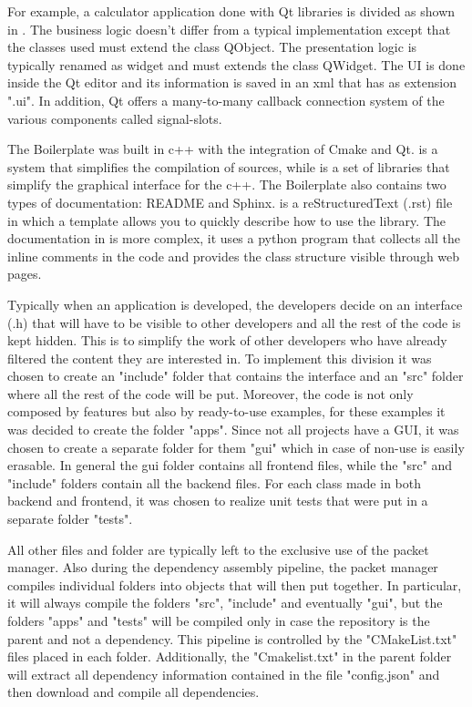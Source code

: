 For example, a calculator application done with Qt libraries is divided as shown in . The business logic doesn't differ from a typical implementation except that the classes used must extend the class QObject. The presentation logic is typically renamed as widget and must extends the class QWidget. The UI is done inside the Qt editor and its information is saved in an xml that has as extension ".ui". In addition, Qt offers a many-to-many callback connection system of the various components called signal-slots.


The Boilerplate was built in c++ with the integration of Cmake and Qt.
 is a system that simplifies the compilation of sources, while  is a set of libraries that simplify the graphical interface for the c++. The Boilerplate also contains two types of documentation: README and Sphinx.
 is a reStructuredText (.rst) file in which a template allows you to quickly describe how to use the library.
The documentation in  is more complex, it uses a python program that collects all the inline comments in the code and provides the class structure visible through web pages.

Typically when an application is developed, the developers decide on an interface (.h) that will have to be visible to other developers and all the rest of the code is kept hidden. This is to simplify the work of other developers who have already filtered the content they are interested in.
To implement this division it was chosen to create an "include" folder that contains the interface and an "src" folder where all the rest of the code will be put.
Moreover, the code is not only composed by features but also by ready-to-use examples, for these examples it was decided to create the folder "apps".
Since not all projects have a GUI, it was chosen to create a separate folder for them "gui" which in case of non-use is easily erasable.
In general the gui folder contains all frontend files, while the "src" and "include" folders contain all the backend files.
For each class made in both backend and frontend, it was chosen to realize unit tests that were put in a separate folder "tests".

All other files and folder are typically left to the exclusive use of the packet manager.
Also during the dependency assembly pipeline, the packet manager compiles individual folders into objects that will then put together. In particular, it will always compile the folders "src", "include" and eventually "gui", but the folders "apps" and "tests" will be compiled only in case the repository is the parent and not a dependency. This pipeline is controlled by the "CMakeList.txt" files placed in each folder.
Additionally, the "Cmakelist.txt" in the parent folder will extract all dependency information contained in the file "config.json" and then download and compile all dependencies.

